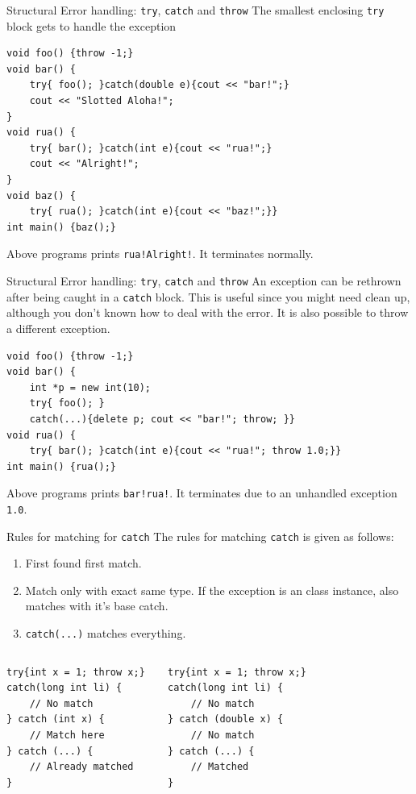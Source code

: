 \begin{frame}[fragile]{Structural Error handling: \texttt{try}, \texttt{catch} and \texttt{throw}}
The smallest enclosing \texttt{try} block gets to handle the exception
\begin{verbatim}
void foo() {throw -1;}
void bar() {
    try{ foo(); }catch(double e){cout << "bar!";}
    cout << "Slotted Aloha!";
}
void rua() {
    try{ bar(); }catch(int e){cout << "rua!";}
    cout << "Alright!";
}
void baz() {
    try{ rua(); }catch(int e){cout << "baz!";}}
int main() {baz();}
\end{verbatim}
Above programs prints \texttt{rua!Alright!}. It terminates normally.

\end{frame}

\begin{frame}[fragile]{Structural Error handling: \texttt{try}, \texttt{catch} and \texttt{throw}}
An exception can be rethrown after being caught in a \texttt{catch} block. This is useful since you might need clean up, although you don't known how to deal with the error. It is also possible to throw a different exception.
\begin{verbatim}
void foo() {throw -1;}
void bar() {
    int *p = new int(10);
    try{ foo(); }
    catch(...){delete p; cout << "bar!"; throw; }}
void rua() {
    try{ bar(); }catch(int e){cout << "rua!"; throw 1.0;}}
int main() {rua();}
\end{verbatim}
Above programs prints \texttt{bar!rua!}. It terminates due to an unhandled exception \texttt{1.0}. 
\end{frame}

\begin{frame}[fragile]{Rules for matching for \texttt{catch}}
The rules for matching \texttt{catch} is given as follows:
\begin{enumerate}
	\item First found first match.
	\item Match only with \alert{exact} same type. If the exception is an class instance, also matches with it's base catch.
	\item \texttt{catch(...)} matches everything.
\end{enumerate}
\begin{columns}

\vspace{-0.2in}
\begin{verbatim}
try{int x = 1; throw x;} 
catch(long int li) {
    // No match
} catch (int x) {
    // Match here
} catch (...) {
    // Already matched
}
\end{verbatim}

	
\vspace{-0.2in}
\begin{verbatim}
try{int x = 1; throw x;}
catch(long int li) {
    // No match
} catch (double x) {
    // No match
} catch (...) {
    // Matched
}
\end{verbatim}

\end{columns}
\end{frame}

